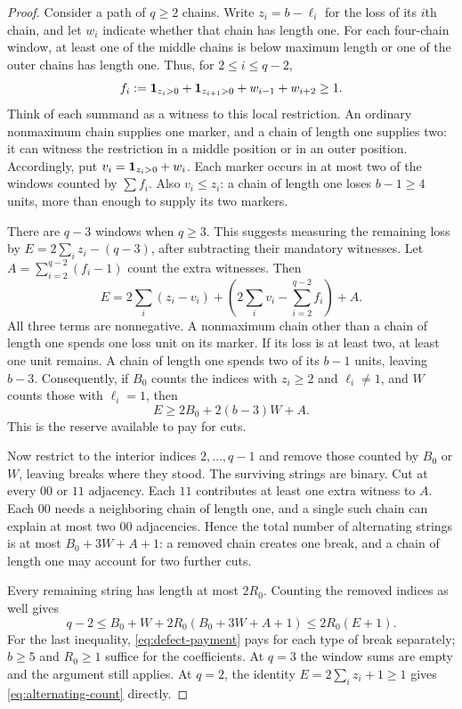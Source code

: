 \begin{proof}
Consider a path of $q\ge2$ chains. Write $z_i=b-\ell_i$ for the loss
of its $i$th chain, and let $w_i$ indicate whether that chain has
length one. For each four-chain window, at least one of the middle
chains is below maximum length or one of the outer chains has length
one. Thus, for $2\le i\le q-2$,
\[
 f_i:=\mathbf{1}_{z_i>0}+\mathbf{1}_{z_{i+1}>0}+w_{i-1}+w_{i+2}\ge1.
\]
Think of each summand as a witness to this local restriction.
An ordinary nonmaximum chain supplies one marker, and a chain of length
one supplies two: it can witness the restriction in a middle position
or in an outer position. Accordingly, put $v_i=\mathbf{1}_{z_i>0}+w_i$.
Each marker occurs in at most two of the windows counted by $\sum f_i$.
Also $v_i\le z_i$: a chain of length one loses $b-1\ge4$ units,
more than enough to supply its two markers.

There are $q-3$ windows when $q\ge3$. This suggests measuring the
remaining loss by $E=2\sum_i z_i-(q-3)$, after subtracting their
mandatory witnesses. Let $A=\sum_{i=2}^{q-2}(f_i-1)$ count the extra
witnesses. Then
\[
 E=2\sum_i(z_i-v_i)
   +\left(2\sum_i v_i-\sum_{i=2}^{q-2}f_i\right)+A.
\]
All three terms are nonnegative. A nonmaximum chain other than a chain
of length one spends one loss unit on its marker. If its loss is at
least two, at least one unit remains. A chain of length one spends two
of its $b-1$ units, leaving $b-3$. Consequently, if $B_0$ counts the
indices with $z_i\ge2$ and $\ell_i\ne1$, and $W$ counts those with
$\ell_i=1$, then
\begin{equation}\label{eq:defect-payment}
 E\ge2B_0+2(b-3)W+A.
\end{equation}
This is the reserve available to pay for cuts.

Now restrict to the interior indices $2,\ldots,q-1$ and remove those
counted by $B_0$ or $W$, leaving breaks where they stood. The surviving
strings are binary. Cut at every $00$ or $11$ adjacency. Each $11$
contributes at least one extra witness to $A$. Each $00$ needs a
neighboring chain of length one, and a single such chain can explain
at most two $00$ adjacencies. Hence the total number of alternating
strings is at most $B_0+3W+A+1$: a removed chain creates one break,
and a chain of length one may account for two further cuts.

Every remaining string has length at most $2R_0$. Counting the removed
indices as well gives
\begin{equation}\label{eq:alternating-count}
 q-2\le B_0+W+2R_0(B_0+3W+A+1)\le2R_0(E+1).
\end{equation}
For the last inequality, \eqref{eq:defect-payment} pays for each type
of break separately; $b\ge5$ and $R_0\ge1$ suffice for the coefficients.
At $q=3$ the window sums are empty and the argument still applies.
At $q=2$, the identity $E=2\sum_i z_i+1\ge1$ gives
\eqref{eq:alternating-count} directly.


\end{proof}
